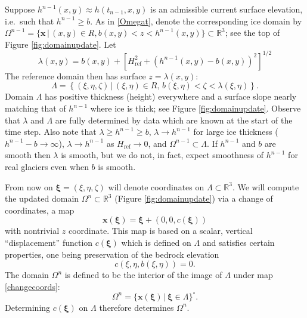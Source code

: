 \documentclass[letterpaper,final,12pt,reqno]{amsart}
\newcommand{\RR}{\mathbb{R}}
\newcommand{\bx}{\mathbf{x}}
\newcommand{\bxi}{\bm{\xi}}
\newcommand{\Href}{H_{\text{ref}}}
\begin{document}
Suppose $h^{n-1}(x,y) \approx h(t_{n-1},x,y)$ is an admissible current surface elevation, i.e.~such that $h^{n-1}\ge b$.  As in \eqref{Omegat}, denote the corresponding ice domain by $\Omega^{n-1}=\{\bx\,\big|\,(x,y)\in R, b(x,y)<z<h^{n-1}(x,y)\} \subset \RR^3$; see the top of Figure \ref{fig:domainupdate}.  Let
\begin{equation}
\lambda(x,y) = b(x,y) + \left[\Href^2 + (h^{n-1}(x,y) - b(x,y))^2\right]^{1/2} \label{definelambda}
\end{equation}
The reference domain then has surface $z=\lambda(x,y)$:
\begin{equation}
\Lambda = \left\{(\xi,\eta,\zeta)\,\big|\,(\xi,\eta)\in R, \, b(\xi,\eta) < \zeta < \lambda(\xi,\eta)\right\}.  \label{Lambda}
\end{equation}
Domain $\Lambda$ has positive thickness (height) everywhere and a surface slope nearly matching that of $h^{n-1}$ where ice is thick; see Figure \ref{fig:domainupdate}.  Observe that $\lambda$ and $\Lambda$ are fully determined by data which are known at the start of the time step.  Also note that $\lambda \ge h^{n-1} \ge b$, $\lambda \to h^{n-1}$ for large ice thickness ($h^{n-1}-b\to\infty$), $\lambda \to h^{n-1}$ as $\Href\to 0$, and $\Omega^{n-1} \subset \Lambda$.  If $h^{n-1}$ and $b$ are smooth then $\lambda$ is smooth, but we do not, in fact, expect smoothness of $h^{n-1}$ for real glaciers even when $b$ is smooth.

From now on $\bxi=(\xi,\eta,\zeta)$ will denote coordinates on $\Lambda \subset \RR^3$.  We will compute the updated domain $\Omega^n \subset \RR^3$ (Figure \ref{fig:domainupdate}) via a change of coordinates, a map
\begin{equation}
\bx(\bxi) = \bxi + (0,0,c(\bxi)) \label{changecoords}
\end{equation}
with nontrivial $z$ coordinate.  This map is based on a scalar, vertical ``displacement'' function $c(\bxi)$ which is defined on $\Lambda$ and satisfies certain properties, one being preservation of the bedrock elevation
\begin{equation}
c(\xi,\eta,b(\xi,\eta))=0. \label{mapbasetobase}
\end{equation}
The domain $\Omega^n$ is defined to be the interior of the image of $\Lambda$ under map \eqref{changecoords}:
\begin{equation}
\Omega^n = \{\bx(\bxi) \,\big|\, \bxi \in \Lambda\}^\circ. \label{updateddomain}
\end{equation}
Determining $c(\bxi)$ on $\Lambda$ therefore determines $\Omega^n$.
\end{document}

